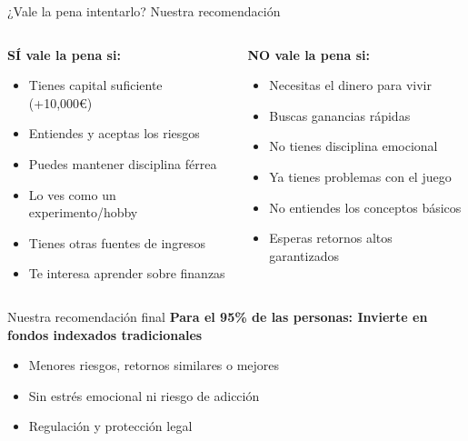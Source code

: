 \documentclass[aspectratio=169]{beamer}
\begin{document}
\begin{frame}{¿Vale la pena intentarlo? Nuestra recomendación}
\begin{columns}
\begin{column}{0.5\textwidth}
\textbf{\textcolor{verdeganancia}{SÍ vale la pena si:}}
\begin{itemize}
\item Tienes capital suficiente (+10,000€)
\item Entiendes y aceptas los riesgos
\item Puedes mantener disciplina férrea
\item Lo ves como un experimento/hobby
\item Tienes otras fuentes de ingresos
\item Te interesa aprender sobre finanzas
\end{itemize}
\end{column}

\begin{column}{0.5\textwidth}
\textbf{\textcolor{rojoperdida}{NO vale la pena si:}}
\begin{itemize}
\item Necesitas el dinero para vivir
\item Buscas ganancias rápidas
\item No tienes disciplina emocional
\item Ya tienes problemas con el juego
\item No entiendes los conceptos básicos
\item Esperas retornos altos garantizados
\end{itemize}
\end{column}
\end{columns}

\vspace{0.5cm}
\begin{alertblock}{Nuestra recomendación final}
\textbf{Para el 95\% de las personas: Invierte en fondos indexados tradicionales}
\begin{itemize}
\item Menores riesgos, retornos similares o mejores
\item Sin estrés emocional ni riesgo de adicción
\item Regulación y protección legal
\end{itemize}
\end{alertblock}
\end{frame}
\end{document}
